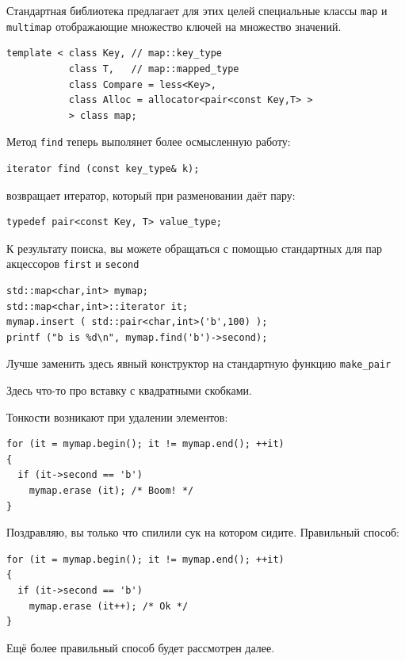 \documentclass[a4paper,12pt,oneside]{article}
\begin{document}
Стандартная библиотека предлагает для этих целей специальные классы \lstinline!map! и \lstinline!multimap! отображающие множество ключей на множество значений.

\begin{lstlisting}
template < class Key, // map::key_type
           class T,   // map::mapped_type
           class Compare = less<Key>, 
           class Alloc = allocator<pair<const Key,T> >
           > class map;
\end{lstlisting}

Метод \lstinline!find! теперь выполянет более осмысленную работу:

\begin{lstlisting}
iterator find (const key_type& k);
\end{lstlisting}

возвращает итератор, который при разменовании даёт пару:

\begin{lstlisting}
typedef pair<const Key, T> value_type;
\end{lstlisting}

К результату поиска, вы можете обращаться с помощью стандартных для пар акцессоров \lstinline!first! и \lstinline!second!

\begin{lstlisting}
std::map<char,int> mymap;
std::map<char,int>::iterator it;
mymap.insert ( std::pair<char,int>('b',100) );
printf ("b is %d\n", mymap.find('b')->second);
\end{lstlisting}

Лучше заменить здесь явный конструктор на стандартную функцию \lstinline!make_pair!

Здесь что-то про вставку с квадратными скобками.

Тонкости возникают при удалении элементов:

\begin{lstlisting}
for (it = mymap.begin(); it != mymap.end(); ++it)
{
  if (it->second == 'b')
    mymap.erase (it); /* Boom! */
}
\end{lstlisting}

Поздравляю, вы только что спилили сук на котором сидите. Правильный способ:

\begin{lstlisting}
for (it = mymap.begin(); it != mymap.end(); ++it)
{
  if (it->second == 'b')
    mymap.erase (it++); /* Ok */
}
\end{lstlisting}

Ещё более правильный способ будет рассмотрен далее.
\end{document}
